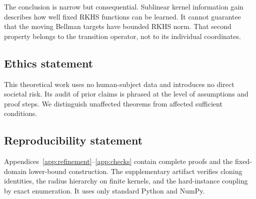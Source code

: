 \documentclass{article}
\begin{document}
The conclusion is narrow but consequential. Sublinear kernel information gain describes how well fixed RKHS functions can be learned. It cannot guarantee that the moving Bellman targets have bounded RKHS norm. That second property belongs to the transition operator, not to its individual coordinates.

\subsection*{Ethics statement}

This theoretical work uses no human-subject data and introduces no direct societal risk. Its audit of prior claims is phrased at the level of assumptions and proof steps. We distinguish unaffected theorems from affected sufficient conditions.

\subsection*{Reproducibility statement}

Appendices~\ref{app:refinement}--\ref{app:checks} contain complete proofs and the fixed-domain lower-bound construction. The supplementary artifact verifies cloning identities, the radius hierarchy on finite kernels, and the hard-instance coupling by exact enumeration. It uses only standard Python and NumPy.




\appendix

\end{document}
